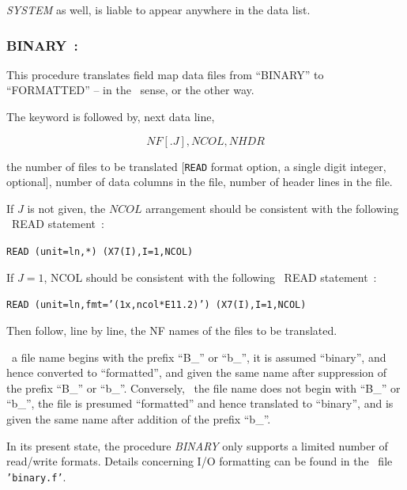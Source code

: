 \medskip

\noindent \textsl{SYSTEM} as well,  is liable to appear anywhere in the data list.



\newpage

\subsubsection*{BINARY~: \BINARYTitl}  \label{BINARY} 
\medskip

This procedure translates field map data files from ``BINARY'' to 
``FORMATTED'' -- in the \FORTRAN\ sense, or the other way.

\bigskip

\noindent The keyword is followed by, next data line,  

$$NF[.J], NCOL, NHDR $$

\noindent  the number of files to be translated [\texttt{READ} format option, a single digit integer, optional],  
number of data columns in the file, 
number of header lines in the file.  

\medskip

\noindent If $J$ is not given, the $NCOL$ arrangement should be consistent with the following \FORTRAN\ READ statement~: 

       {\tt     READ (unit=ln,*) (X7(I),I=1,NCOL)}

\medskip

\noindent If $J=1$, NCOL should be consistent with the following \FORTRAN\ READ statement~: 

       {\tt     READ (unit=ln,fmt='(1x,ncol*E11.2)') (X7(I),I=1,NCOL)}

 
\medskip

\noindent Then follow, line by line, the NF names of the files to be translated.

\medskip

\noindent \If\ a file name begins with the prefix ``B\_'' or ``b\_'', it is 
assumed ``binary'', and hence converted to ``formatted'', and given 
the same name after suppression of the prefix ``B\_'' or ``b\_''. Conversely, 
\Iff\ the file name does not begin with ``B\_'' or ``b\_'', the file is 
presumed ``formatted'' and hence translated to ``binary'', and is 
given the same name after addition of the prefix ``b\_''.

\medskip

\noindent In its present state, the procedure \textsl{BINARY} 
only supports a limited number of read/write formats. Details concerning I/O formatting can be found 
in the \FORTRAN\ file \texttt{'binary.f'}.





